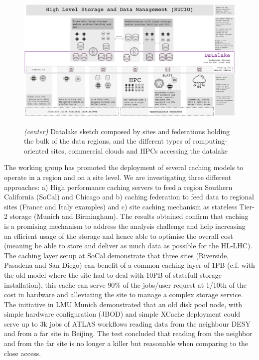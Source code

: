 \begin{figure}[h]
  \centering
  \includegraphics[height=6.8cm]{datalake-sketch.png}
  \caption{{\em (center)} Datalake sketch composed by sites and federations holding the bulk of the data regions, and the different types of computing-oriented sites, commercial clouds and HPCs accessing the datalake }
  \label{fig:datalake-sketch}
\end{figure}
The working group has promoted the deployment of several caching models to operate in a region and on a site level. We are investigating three different approaches: a) High performance caching servers to feed a region Southern California (SoCal) and Chicago and b) caching federation to feed data to regional sites (France and Italy examples) and c) site caching mechanism as stateless Tier-2 storage (Munich and Birmingham). The results obtained confirm that caching is a promising mechanism to address the analysis challenge and help increasing an efficient usage of the storage and hence able to optimise the overall cost (meaning be able to store and deliver as much data as possible for the HL-LHC). \\
The caching layer setup at SoCal demonstrate that three sites (Riverside, Pasadena and San Diego) can benefit of a common caching layer of 1PB (c.f. with the old model where the site had to deal with 10PB of statefull storage installation), this cache can serve 90\% of the jobs/user request at 1/10th of the cost in hardware and alleviating the site to manage a complex storage service.\\
The initiative in LMU Munich demonstrated that an old disk pool node, with simple hardware configuration (JBOD) and simple XCache deployment could serve up to 3k jobs of ATLAS workflows reading data from the neighbour DESY and from a far site in Beijing. The test concluded that reading from the neighbor and from the far site is no longer a killer but reasonable when comparing to the close access.

